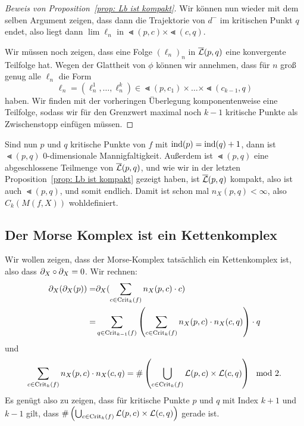 \begin{proof}[Beweis von Proposition~\ref{prop: Lb ist kompakt}]
    Wir können nun wieder mit dem selben Argument zeigen, dass dann die Trajektorie von $d^-$ im
    kritischen Punkt $q$ endet, also liegt dann $\lim \ell_n$ in $\Lt (p, c) \times \Lt (c, q)$.

    Wir müssen noch zeigen, dass eine Folge $(\ell_n)_n$ in ${\overline{\mathcal{L}} } (p, q)$ eine konvergente 
    Teilfolge hat. Wegen der Glattheit von $\phi$ können wir annehmen, dass für $n$ groß 
    genug alle $\ell_n$ die Form 
    \[ \ell_n = (\ell^1_n, \dots, \ell^k_n) \in \Lt (p, c_1) \times \dots \times \Lt (c_{k - 1}, q) \]
    haben. Wir finden mit der vorheringen Überlegung komponentenweise eine Teilfolge, sodass wir 
    für den Grenzwert maximal noch $k - 1$ kritische Punkte als \glqq Zwischenstopp\grqq{} einfügen
    müssen. 
\end{proof}

\begin{remark}
    Sind nun $p$ und $q$ kritische Punkte von $f$ mit ${ \operatorname{ind} } (p) = { \operatorname{ind} } (q) + 1$, dann ist 
    $\Lt(p, q)$ $0$-dimensionale Mannigfaltigkeit. Außerdem ist $\Lt (p, q)$ eine abgeschlossene
    Teilmenge von ${\overline{\mathcal{L}} } (p, q)$, und wie wir in der letzten Proposition~\ref{prop: Lb ist kompakt}
    gezeigt haben, ist ${\overline{\mathcal{L}} }(p, q)$ kompakt, also ist auch $\Lt(p, q)$, und somit endlich.
    Damit ist schon mal $n_X (p, q)< \infty$, also $C_k(M (f, X))$ wohldefiniert.
\end{remark}

\subsection*{Der Morse Komplex ist ein Kettenkomplex}

Wir wollen zeigen, dass der Morse-Komplex tatsächlich ein Kettenkomplex ist, also dass 
${ \partial }_X \circ { \partial }_X = 0$.
Wir rechnen:
\begin{align*}
    { \partial }_X ({ \partial }_X (p)) = & { \partial }_X (\sum_{c \in { \operatorname{Crit} }_k (f)} n_X (p, c) \cdot c) \\
    = & \sum_{q \in { \operatorname{Crit} }_{k - 1}(f)} \left( 
        \sum_{c \in { \operatorname{Crit} }_k (f)} n_X(p, c) \cdot n_X(c, q) \right) \cdot q
\end{align*}
und 
\[ \sum_{c \in { \operatorname{Crit} }_k (f)} n_X(p, c) \cdot n_X(c, q) = 
\# \left( \bigcup_{c \in { \operatorname{Crit} }_k (f)} { \mathcal{L} } (p, c) \times { \mathcal{L} } (c, q) \right) \mod 2 . \]
Es genügt also zu zeigen, dass für kritische Punkte $p$ und $q$ mit Index $k + 1$ und $k - 1$
gilt, dass $\# \left( \bigcup_{c \in { \operatorname{Crit} }_k (f)} { \mathcal{L} } (p, c) \times { \mathcal{L} } (c, q) \right)$ gerade ist.

